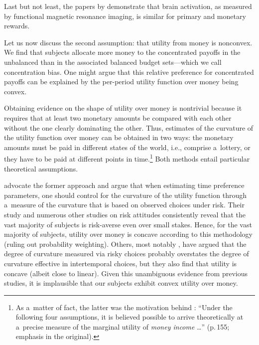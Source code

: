 Last but not least, the papers by \cite{McClure2004a, McClure2007} demonstrate that brain activation, as measured by functional magnetic resonance imaging, is similar for primary and monetary rewards.

Let us now discuss the second assumption: that utility from money is nonconvex. We find that subjects allocate more money to the concentrated payoffs in the unbalanced than in the associated balanced budget sets---which we call concentration bias. One might argue that this relative preference for concentrated payoffs can be explained by the per-period utility function over money being convex.

Obtaining evidence on the shape of utility over money is nontrivial because it requires that at least two monetary amounts be compared with each other without the one clearly dominating the other. Thus, estimates of the curvature of the utility function over money can be obtained in two ways: the monetary amounts must be paid in different states of the world, i.e., comprise a~lottery, or they have to be paid at different points in time.\footnote{As a~matter of fact, the latter was the motivation behind \cite{Samuelson1937}: ``Under the following four assumptions, it is believed possible to arrive theoretically at a~precise measure of the marginal utility of \textit{money income} \dots'' (p.\,155; emphasis in the original).} Both methods entail particular theoretical assumptions.

\cite{Andersen2008} advocate the former approach and argue that when estimating time preference parameters, one should control for the curvature of the utility function through a~measure of the curvature that is based on observed choices under risk. Their study and numerous other studies on risk attitudes consistently reveal that the vast majority of subjects is risk-averse even over small stakes. Hence, for the vast majority of subjects, utility over money is concave according to this methodology (ruling out probability weighting). Others, most notably \cite{Andreoni2012}, have argued that the degree of curvature measured via risky choices probably overstates the degree of curvature effective in intertemporal choices, but they also find that utility is concave (albeit close to linear). Given this unambiguous evidence from previous studies, it is implausible that our subjects exhibit convex utility over money.
